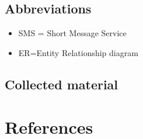 \documentclass[]{article}
\begin{document}
\subsection{ Abbreviations}
\begin{itemize}

\item SMS = Short Message Service
\item ER=Entity Relationship diagram

\end{itemize}

\subsection{Collected material}

\section {References}




\end{document}
